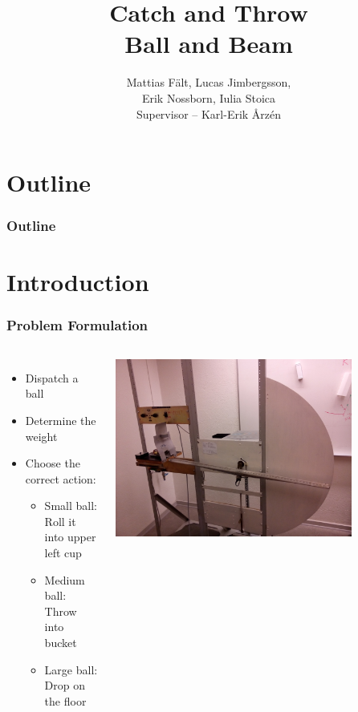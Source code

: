 \documentclass[
compress]
{beamer}
\title[Catch and Throw]{Catch and Throw\\Ball and Beam}
\author[]{Mattias Fält, Lucas Jimbergsson,\\Erik Nossborn, Iulia Stoica\\\vspace{1em}Supervisor -- Karl-Erik Årz\'{e}n}
\begin{document}
\frame{\titlepage}

\section*{Outline}

\frame
{
  \frametitle{Outline}
  \tableofcontents%
}

\section{Introduction}
\frame{\sectionpage}
\begin{frame}
\frametitle{Problem Formulation}
\begin{columns}
\column{180pt}
\begin{itemize}
\item Dispatch a ball
\item Determine the weight
\item Choose the correct action:
\begin{itemize}
\item Small ball: Roll it into upper left cup
\item Medium ball: Throw into bucket
\item Large ball: Drop on the floor
\end{itemize}
\end{itemize}

\column{150pt}
\centering
\includegraphics[width=0.8\textwidth]{figures/process_fig.jpg}
\end{columns}
\end{frame}



\end{document}
